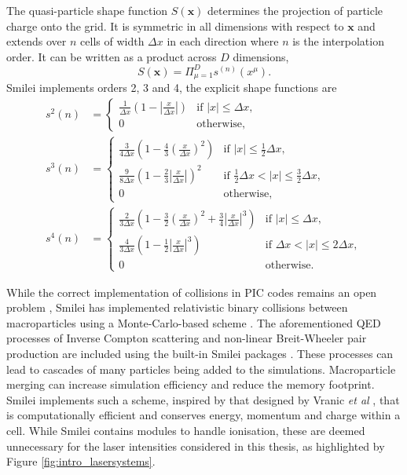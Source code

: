 The quasi-particle shape function $S(\mathbf{x})$ determines the projection of particle charge onto the grid. It is symmetric in all dimensions with respect to $\mathbf{x}$ and extends over $n$ cells of width $\Delta x$ in each direction where $n$ is the interpolation order. It can be written as a product across $D$ dimensions,
\begin{equation}
	S(\mathbf{x}) = \Pi^D_{\mu = 1}s^{(n)}(x^\mu).
\end{equation}
Smilei implements orders 2, 3 and 4, the explicit shape functions are
\begin{subequations}
	\begin{align}
		s^2 (n) &= \begin{cases}
			\frac{1}{\Delta x}\left(1-\left|\frac{x}{\Delta x}\right| \right)  & \text{if } |x| \le \Delta x, \\
			0  & \text{otherwise,}
		\end{cases} \\
		s^3(n) &= \begin{cases}
			\frac{3}{4\Delta x}\left(1-\frac{4}{3}\left(\frac{x}{\Delta x}\right)^2 \right)  & \text{if } |x| \le \frac{1}{2}\Delta x, \\
			\frac{9}{8\Delta x}\left(1-\frac{2}{3}\left|\frac{x}{\Delta x}\right| \right)^2  & \text{if } \frac{1}{2}\Delta x <|x| \le \frac{3}{2} \Delta x, \\
			0  & \text{otherwise,}
		\end{cases}  \\
		s^4(n) &= \begin{cases}
			\frac{2}{3 \Delta x}\left( 1-\frac{3}{2}\left(\frac{x}{\Delta x}\right)^2 + \frac{3}{4}\left| \frac{x}{\Delta x}\right| ^3 \right)  & \text{if } |x| \le \Delta x, \\
			\frac{4}{3 \Delta x}\left(1-\frac{1}{2}\left|\frac{x}{\Delta x}\right| ^3 \right)  & \text{if } \Delta x <|x| \le 2\Delta x, \\
			0  & \text{otherwise.}
		\end{cases} 
	\end{align}
\end{subequations}

While the correct implementation of collisions in PIC codes remains an open problem \cite{Collisions}, Smilei has implemented relativistic binary collisions between macroparticles using a Monte-Carlo-based scheme \cite{perezImprovedModelingRelativistic2012}. The aforementioned QED processes of Inverse Compton scattering and non-linear Breit-Wheeler pair production are included using the built-in Smilei packages \cite{derouillatSmileiCollaborativeOpensource2018}. These processes can lead to cascades of many particles being added to the simulations. Macroparticle merging can increase simulation efficiency and reduce the memory footprint. Smilei implements such a scheme, inspired by that designed by Vranic \textit{et al} \cite{vranicParticleMergingAlgorithm2015}, that is computationally efficient and conserves energy, momentum and charge within a cell. While Smilei contains modules to handle ionisation, these are deemed unnecessary for the laser intensities considered in this thesis, as highlighted by Figure \ref{fig:intro_lasersystems}.

